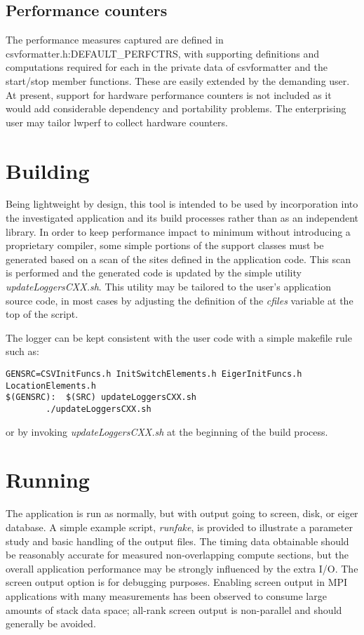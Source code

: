 \documentclass{article}
\begin{document}
\subsection{Performance counters}
The performance measures captured are defined in csvformatter.h:DEFAULT\_PERFCTRS, with supporting definitions and computations required for each in the private data of csvformatter and the start/stop member functions. These are easily extended by the demanding user. At present, support for hardware performance counters is not included as it would add considerable dependency and portability problems. The enterprising user may tailor lwperf to collect hardware counters.


\section{Building}
Being lightweight by design, this tool is intended to be used by incorporation into the investigated application and its build processes rather than as an independent library.  In order to keep performance impact to minimum without introducing a proprietary compiler, some simple portions of the support classes must be generated based on a scan of the sites defined in the application code. This scan is performed and the generated code is updated by the simple utility {\em updateLoggersCXX.sh}. This utility may be tailored to the user's application source code, in most cases by adjusting the definition of the {\em cfiles} variable at the top of the script.

The logger can be kept consistent with the user code with a simple makefile rule such as:
\begin{verbatim}
GENSRC=CSVInitFuncs.h InitSwitchElements.h EigerInitFuncs.h LocationElements.h
$(GENSRC):  $(SRC) updateLoggersCXX.sh
        ./updateLoggersCXX.sh
\end{verbatim}
or by invoking {\em updateLoggersCXX.sh} at the beginning of the build process.

\section{Running}
\label{sec:running}
The application is run as normally, but with output going to screen, disk, or eiger database. A simple example script, {\em runfake}, is provided to illustrate a parameter study and basic handling of the output files.
The timing data obtainable should be reasonably accurate for measured non-overlapping compute sections, but the overall application performance may be strongly influenced by the extra I/O.
The screen output option is for debugging purposes.
Enabling screen output in MPI applications with many measurements has been observed to consume large amounts of stack data space; all-rank screen output is non-parallel and should generally be avoided. 
\end{document}
